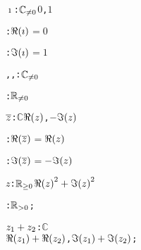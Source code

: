 \begin{alltt}
  \({\imath}\): \({\pvssubscript{\mathbb{C}}{{\not=}0}}\) \pvskey{=} \pvsid{(}\(0\), \(1\)\pvsid{)}\vspace*{\pvsdeclspacing}

  :  \(\Reonefn{{\imath}}\) \(=\) \(0\)\vspace*{\pvsdeclspacing}

  :  \(\Imonefn{{\imath}}\) \(=\) \(1\)\vspace*{\pvsdeclspacing}

   


   


  , , :  \({\pvssubscript{\mathbb{C}}{{\not=}0}}\)\vspace*{\pvsdeclspacing}

  :  \({\pvssubscript{\mathbb{R}}{{\not=}0}}\)\vspace*{\pvsdeclspacing}

  \(\conjugateonefn{z}\): \(\mathbb{C}\) \pvskey{=} \pvsid{(}\(\Reonefn{z}\), \(\opdifferenceonefn{\Imonefn{z}}\)\pvsid{)}\vspace*{\pvsdeclspacing}

  :  \(\Reonefn{\conjugateonefn{z}}\) \(=\) \(\Reonefn{z}\)\vspace*{\pvsdeclspacing}

  :  \(\Imonefn{\conjugateonefn{z}}\) \(=\) \(\opdifferenceonefn{\Imonefn{z}}\)\vspace*{\pvsdeclspacing}

   


   


  \pvsid{(}\(z\)\pvsid{)}: \({\pvssubscript{\mathbb{R}}{{\geq}0}}\) \pvskey{=} \(\opplustwofn{\sqonefn{\Reonefn{z}}}{\sqonefn{\Imonefn{z}}}\)\vspace*{\pvsdeclspacing}

  :  \pvsid{(}\pvsid{)}  \({\pvssubscript{\mathbb{R}}{{>}0}}\);\vspace*{\pvsdeclspacing}

  \(\opplustwofn{z\sb{1}}{z\sb{2}}\): \(\mathbb{C}\) \pvskey{=}
      \pvsid{(}\(\opplustwofn{\Reonefn{z\sb{1}}}{\Reonefn{z\sb{2}}}\), \(\opplustwofn{\Imonefn{z\sb{1}}}{\Imonefn{z\sb{2}}}\)\pvsid{)};\vspace*{\pvsdeclspacing}


\end{alltt}
